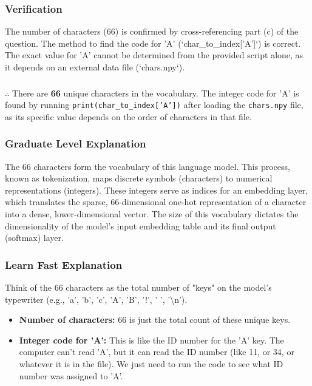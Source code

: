 \documentclass{article}
\begin{document}
{{{\subsubsection*{Verification}
The number of characters (66) is confirmed by cross-referencing part (c) of the question. The method to find the code for 'A' (`char_to_index['A']`) is correct. The exact value for 'A' cannot be determined from the provided script alone, as it depends on an external data file (`chars.npy`).

\subsubsection*{\normalfont}{$\therefore$ There are \textbf{66} unique characters in the vocabulary. The integer code for 'A' is found by running \texttt{print(char\_to\_index['A'])} after loading the \texttt{chars.npy} file, as its specific value depends on the order of characters in that file.}

\subsubsection*{Graduate Level Explanation}
The 66 characters form the vocabulary of this language model. This process, known as tokenization, maps discrete symbols (characters) to numerical representations (integers). These integers serve as indices for an embedding layer, which translates the sparse, 66-dimensional one-hot representation of a character into a dense, lower-dimensional vector. The size of this vocabulary dictates the dimensionality of the model's input embedding table and its final output (softmax) layer.

\subsubsection*{Learn Fast Explanation}
Think of the 66 characters as the total number of "keys" on the model's typewriter (e.g., 'a', 'b', 'c', 'A', 'B', '!', ' ', '\textbackslash n').
\begin{itemize}
    \item \textbf{Number of characters:} 66 is just the total count of these unique keys.
    \item \textbf{Integer code for 'A':} This is like the ID number for the 'A' key. The computer can't read 'A', but it can read the ID number (like 11, or 34, or whatever it is in the file). We just need to run the code to see what ID number was assigned to 'A'.
\end{itemize}

}}}
\end{document}
